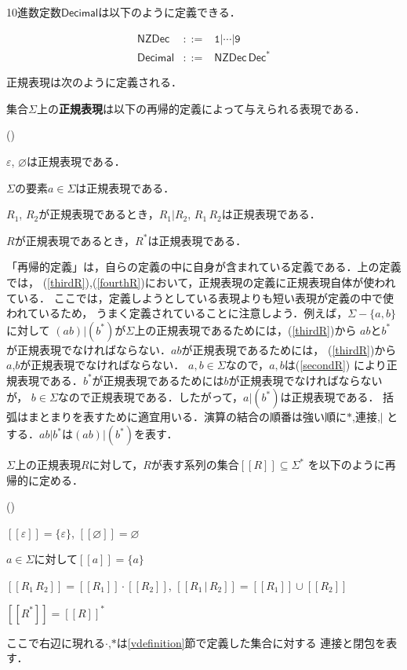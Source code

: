 \documentclass[dvipdfmx,a4j]{jbook}
\newcounter{coffee}
\begin{document}
10進数定数$\mathsf{Decimal}$は以下のように定義できる．

\[\begin{array}{rcl}
  \mathsf{NZDec} &\mathtt{::=}& \texttt{1}|\cdots|\texttt{9}\\
  \mathsf{Decimal}&\mathtt{::=}&\mathsf{NZDec}\,\mathsf{Dec}^\ast
\end{array}\]

正規表現は次のように定義される．

\begin{Def}
  集合$\Sigma$上の{\bf 正規表現}は以下の再帰的定義によって与えられる表現である．
  \begin{list}{()}{}
    \item\label{firstR} $\varepsilon$, $\varnothing$は正規表現である．
    \item\label{secondR} $\Sigma$の要素$a\in\Sigma$は正規表現である．
    \item\label{thirdR} $R_1$, $R_2$が正規表現であるとき，$R_1|R_2$, $R_1\,R_2$は正規表現である．
    \item\label{fourthR} $R$が正規表現であるとき，$R^\ast$は正規表現である．
  \end{list}
\end{Def}

「再帰的定義」は，自らの定義の中に自身が含まれている定義である．上の定義では，
(\ref{thirdR}),(\ref{fourthR})において，正規表現の定義に正規表現自体が使われている．
ここでは，定義しようとしている表現よりも短い表現が定義の中で使われているため，
うまく定義されていることに注意しよう．例えば，$\Sigma-\{a,b\}$に対して
$(ab)|(b^\ast)$が$\Sigma$上の正規表現であるためには，(\ref{thirdR})から
$ab$と$b^\ast$が正規表現でなければならない．$ab$が正規表現であるためには，
(\ref{thirdR})から$a$,$b$が正規表現でなければならない．
$a,b\in\Sigma$なので，$a,b$は(\ref{secondR})
により正規表現である．$b^\ast$が正規表現であるためには$b$が正規表現でなければならないが，
$b\in\Sigma$なので正規表現である．したがって，$a|(b^\ast)$は正規表現である．
括弧はまとまりを表すために適宜用いる．演算の結合の順番は強い順に$\ast$,連接,$|$
とする．$ab|b^\ast$は$(ab)|(b^\ast)$を表す．

\begin{Def}
  $\Sigma$上の正規表現$R$に対して，$R$が表す系列の集合$[\![R]\!]\subseteq\Sigma^\ast$
  を以下のように再帰的に定める．
  \begin{list}{()}{}
    \item $[\![\varepsilon]\!]=\{\varepsilon\}$, $[\![\varnothing]\!]=\varnothing$
    \item $a\in\Sigma$に対して$[\![a]\!]=\{a\}$
    \item $[\![R_1\,R_2]\!]=[\![R_1]\!]\cdot[\![R_2]\!]$, $[\![R_1\,|\,R_2]\!]=
    [\![R_1]\!]\cup[\![R_2]\!]$
    \item $[\![R^\ast]\!]=[\![R]\!]^\ast$
  \end{list}
  ここで右辺に現れる$\cdot$,$\ast$は\ref{vdefinition}節で定義した集合に対する
  連接と閉包を表す．
\end{Def}
\end{document}
